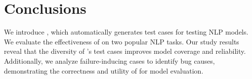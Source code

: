 \section{Conclusions}
\label{sec:concl}

We introduce \tool, which automatically generates test cases for testing NLP models. We evaluate the effectiveness of \tool on two popular NLP tasks.
Our study results reveal that the diversity of \tool's test cases improves model coverage and reliability. Additionally, we analyze failure-inducing cases to identify bug causes, demonstrating the correctness and utility of \tool for model evaluation.